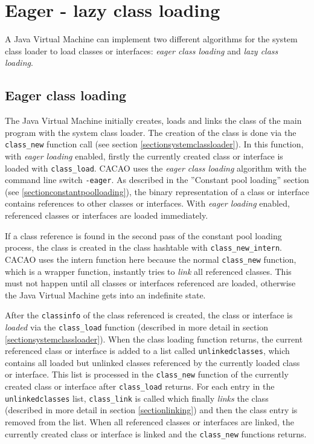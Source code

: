 

\section{Eager - lazy class loading}

A Java Virtual Machine can implement two different algorithms for the
system class loader to load classes or interfaces: \textit{eager class
loading} and \textit{lazy class loading}.


\subsection{Eager class loading}
\label{sectioneagerclassloading}

The Java Virtual Machine initially creates, loads and links the class
of the main program with the system class loader. The creation of the
class is done via the \texttt{class\_new} function call (see section
\ref{sectionsystemclassloader}). In this function, with \textit{eager
loading} enabled, firstly the currently created class or interface is
loaded with \texttt{class\_load}. CACAO uses the \textit{eager class
loading} algorithm with the command line switch \texttt{-eager}. As
described in the ''Constant pool loading'' section (see
\ref{sectionconstantpoolloading}), the binary representation of a
class or interface contains references to other classes or
interfaces. With \textit{eager loading} enabled, referenced classes or
interfaces are loaded immediately.

If a class reference is found in the second pass of the constant pool
loading process, the class is created in the class hashtable with
\texttt{class\_new\_intern}. CACAO uses the intern function here
because the normal \texttt{class\_new} function, which is a wrapper
function, instantly tries to \textit{link} all referenced
classes. This must not happen until all classes or interfaces
referenced are loaded, otherwise the Java Virtual Machine gets into an
indefinite state.

After the \texttt{classinfo} of the class referenced is created, the
class or interface is \textit{loaded} via the \texttt{class\_load}
function (described in more detail in section
\ref{sectionsystemclassloader}). When the class loading function
returns, the current referenced class or interface is added to a list
called \texttt{unlinkedclasses}, which contains all loaded but
unlinked classes referenced by the currently loaded class or
interface. This list is processed in the \texttt{class\_new} function
of the currently created class or interface after \texttt{class\_load}
returns. For each entry in the \texttt{unlinkedclasses} list,
\texttt{class\_link} is called which finally \textit{links} the class
(described in more detail in section \ref{sectionlinking}) and then
the class entry is removed from the list. When all referenced classes
or interfaces are linked, the currently created class or interface is
linked and the \texttt{class\_new} functions returns.


